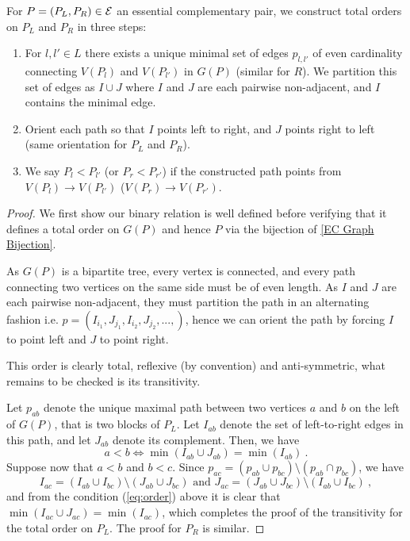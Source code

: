 \begin{construction} 
\label{Order Lemma}
For $P=(P_L,P_R) \in \mathcal{E}$ an essential complementary pair, we construct total orders on $P_L$ and $P_R$ in three steps:
\begin{enumerate}
    \item For $l,l' \in L$ there exists a unique minimal set of edges $p_{l,l'}$ of even cardinality connecting $V(P_l)$ and $V(P_{l'})$ in $G(P)$ (similar for $R$). We partition this set of edges as $I\cup J$ where $I$ and $J$ are each pairwise non-adjacent, and $I$ contains the minimal edge.
    \item Orient each path so that $I$ points left to right, and $J$ points right to left (same orientation for $P_L$ and $P_R$). 
    \item We say $P_l< P_{l'}$ (or $P_r < P_{r'}$) if the constructed path points from $V(P_l) \to V(P_{l'})$ ($V(P_r) \to V(P_{r'})$.
\end{enumerate}
\end{construction}

\begin{proof}
We first show our binary relation is well defined before verifying that it defines a total order on $G(P)$ and hence $P$ via the bijection of \cref{EC Graph Bijection}.

As $G(P)$ is a bipartite tree, every vertex is connected, and every path connecting two vertices on the same side must be of even length. 
As $I$ and $J$ are each pairwise non-adjacent, they must partition the path in an alternating fashion i.e. $p=(I_{i_1},J_{j_1},I_{i_2},J_{j_2},..., )$, hence we can orient the path by forcing $I$ to point left and $J$ to point right.

This order is clearly total, reflexive (by convention) and anti-symmetric, what remains to be checked is its transitivity. 

Let $p_{ab}$ denote the unique maximal path between two vertices $a$ and $b$ on the left of $G(P)$, that is two blocks of $P_L$. 
Let $I_{ab}$ denote the set of left-to-right edges in this path, and let $J_{ab}$ denote its complement. 
Then, we have 
\begin{equation}
    \label{eq:order}
    a < b \iff \min(I_{ab}\cup J_{ab})=\min(I_{ab}) \ . 
\end{equation}
Suppose now that $a < b$ and $b < c$.
Since $p_{ac}= (p_{ab} \cup p_{bc}) \setminus (p_{ab} \cap p_{bc})$, we have $$ I_{ac}=(I_{ab}\cup I_{bc}) \setminus (J_{ab} \cup J_{bc}) \text{ and } J_{ac}=(J_{ab}\cup J_{bc}) \setminus (I_{ab} \cup I_{bc}) \ , $$ and from the condition (\ref{eq:order}) above it is clear that $\min(I_{ac}\cup J_{ac})=\min(I_{ac})$, which completes the proof of the transitivity for the total order on $P_L$. 
The proof for $P_R$ is similar. 
\end{proof}

